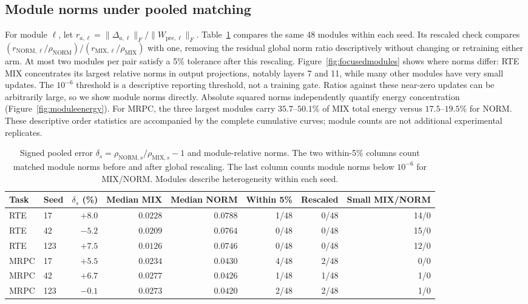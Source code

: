 \documentclass{article}
\newcommand{\pre}{\mathrm{pre}}
\begin{document}
\subsection{Module norms under pooled matching}
\label{app:focusedmodules}
For module $\ell$, let $r_{a,\ell}=\|\Delta_{a,\ell}\|_F/\|W_{\pre,\ell}\|_F$. Table~\ref{tab:focusedmodules} compares the same 48 modules within each seed. Its rescaled check compares $(r_{\mathrm{NORM},\ell}/\rho_{\mathrm{NORM}})/(r_{\mathrm{MIX},\ell}/\rho_{\mathrm{MIX}})$ with one, removing the residual global norm ratio descriptively without changing or retraining either arm. At most two modules per pair satisfy a 5\% tolerance after this rescaling. Figure~\ref{fig:focusedmodules} shows where norms differ: RTE MIX concentrates its largest relative norms in output projections, notably layers 7 and 11, while many other modules have very small updates. The $10^{-6}$ threshold is a descriptive reporting threshold, not a training gate. Ratios against these near-zero updates can be arbitrarily large, so we show module norms directly. Absolute squared norms independently quantify energy concentration (Figure~\ref{fig:moduleenergy}). For MRPC, the three largest modules carry $35.7$--$50.1\%$ of MIX total energy versus $17.5$--$19.5\%$ for NORM. These descriptive order statistics are accompanied by the complete cumulative curves; module counts are not additional experimental replicates.

\begin{table}[t]
\centering
\caption{Signed pooled error $\delta_s=\rho_{\mathrm{NORM},s}/\rho_{\mathrm{MIX},s}-1$ and module-relative norms. The two within-5\% columns count matched module norms before and after global rescaling. The last column counts module norms below $10^{-6}$ for MIX/NORM. Modules describe heterogeneity within each seed.}
\label{tab:focusedmodules}
\begin{adjustbox}{max width=\linewidth}
\begin{tabular}{llrrrrrr}
\toprule
Task & Seed & $\delta_s$ (\%) & Median MIX & Median NORM & Within 5\% & Rescaled & Small MIX/NORM\\
\midrule
RTE & 17 & $+8.0$ & $0.0228$ & $0.0788$ & 1/48 & 0/48 & 14/0 \\
RTE & 42 & $-5.2$ & $0.0209$ & $0.0764$ & 0/48 & 0/48 & 15/0 \\
RTE & 123 & $+7.5$ & $0.0126$ & $0.0746$ & 0/48 & 0/48 & 12/0 \\
\midrule
MRPC & 17 & $+5.5$ & $0.0234$ & $0.0430$ & 4/48 & 2/48 & 0/0 \\
MRPC & 42 & $+6.7$ & $0.0277$ & $0.0426$ & 1/48 & 1/48 & 1/0 \\
MRPC & 123 & $-0.1$ & $0.0273$ & $0.0420$ & 2/48 & 2/48 & 1/0 \\
\bottomrule
\end{tabular}
\end{adjustbox}
\end{table}
\end{document}
